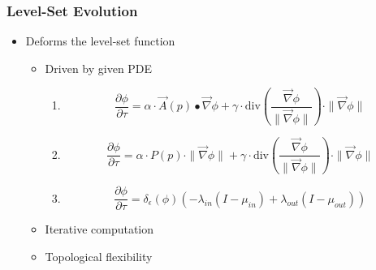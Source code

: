 \documentclass[18pt]{beamer}
\begin{document}
\begin{frame}
 \frametitle{Level-Set Evolution}
\begin{itemize}
  \item Deforms the level-set function
  \begin{itemize}
    \item Driven by given PDE
    \begin{enumerate}
      \item<2->[yo1]
      \begin{equation*}
      \frac{\partial \phi}{\partial \tau} = 
      \alpha \cdot \overrightarrow{A}(p) \bullet \overrightarrow{\nabla} \phi +
      \gamma \cdot \text{div}\left( \frac{\overrightarrow{\nabla}
      \phi}{\|\overrightarrow{\nabla} \phi\|} \right) \cdot
    \|\overrightarrow{\nabla}
      \phi\|
      \end{equation*}
      \item<3->[yo2]
      \begin{equation*}
      \frac{\partial \phi}{\partial \tau} = 
      \alpha \cdot P(p) \cdot \|\overrightarrow{\nabla} \phi \| +
      \gamma \cdot \text{div}\left( \frac{\overrightarrow{\nabla}
      \phi}{\|\overrightarrow{\nabla} \phi\|} \right) \cdot
    \|\overrightarrow{\nabla}
      \phi\|
      \end{equation*}
      \item<4->[yo3]
      \begin{equation*}
      \frac{\partial \phi}{\partial \tau} = \delta_{\epsilon}(\phi) 
      \left(
      - \lambda_{in} \left( I - \mu_{in} \right) + 
      \lambda_{out} \left( I - \mu_{out} \right)
      \right)
      \end{equation*}
    \end{enumerate}
    \item<5-> Iterative computation
    \item<6> Topological flexibility
  \end{itemize}
\end{itemize}
\end{frame}
\end{document}
